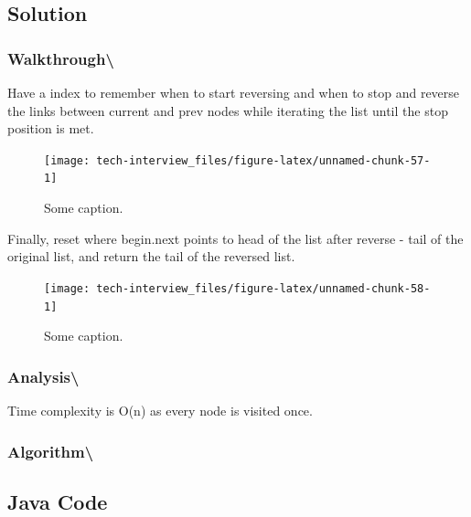 \documentclass[]{book}
\begin{document}
\hypertarget{solution-61}{%
\subsection{Solution}\label{solution-61}}

\hypertarget{walkthrough-104}{%
\subsubsection{Walkthrough\textbackslash{}}\label{walkthrough-104}}

Have a index to remember when to start reversing and when to stop and reverse the links between current and prev nodes
while iterating the list until the stop position is met.

\begin{figure}
\texttt{[image: tech-interview\_files/figure-latex/unnamed-chunk-57-1]} \caption{Some caption.}\label{fig:unnamed-chunk-57}
\end{figure}

Finally, reset where begin.next points to head of the list after reverse - tail of the original list, and return the
tail of the reversed list.

\begin{figure}
\texttt{[image: tech-interview\_files/figure-latex/unnamed-chunk-58-1]} \caption{Some caption.}\label{fig:unnamed-chunk-58}
\end{figure}

\hypertarget{analysis-111}{%
\subsubsection{Analysis\textbackslash{}}\label{analysis-111}}

Time complexity is O(n) as every node is visited once.

\hypertarget{algorithm-117}{%
\subsubsection{Algorithm\textbackslash{}}\label{algorithm-117}}

\hypertarget{java-code-68}{%
\subsection{Java Code}\label{java-code-68}}
\end{document}

